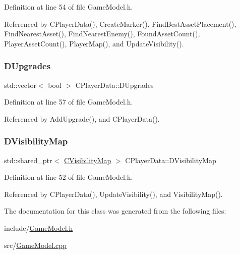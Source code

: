 Definition at line 54 of file Game\+Model.\+h.



Referenced by C\+Player\+Data(), Create\+Marker(), Find\+Best\+Asset\+Placement(), Find\+Nearest\+Asset(), Find\+Nearest\+Enemy(), Found\+Asset\+Count(), Player\+Asset\+Count(), Player\+Map(), and Update\+Visibility().

\hypertarget{classCPlayerData_ae7cb90c31ec46b65ba88485368a4b96a}{}\label{classCPlayerData_ae7cb90c31ec46b65ba88485368a4b96a} 
\subsubsection{\texorpdfstring{D\+Upgrades}{DUpgrades}}
{\footnotesize\ttfamily std\+::vector$<$ bool $>$ C\+Player\+Data\+::\+D\+Upgrades\hspace{0.3cm}{\ttfamily [protected]}}



Definition at line 57 of file Game\+Model.\+h.



Referenced by Add\+Upgrade(), and C\+Player\+Data().

\hypertarget{classCPlayerData_a804ea65e7ec7c90b2e335414d106cc78}{}\label{classCPlayerData_a804ea65e7ec7c90b2e335414d106cc78} 
\subsubsection{\texorpdfstring{D\+Visibility\+Map}{DVisibilityMap}}
{\footnotesize\ttfamily std\+::shared\+\_\+ptr$<$ \hyperlink{classCVisibilityMap}{C\+Visibility\+Map} $>$ C\+Player\+Data\+::\+D\+Visibility\+Map\hspace{0.3cm}{\ttfamily [protected]}}



Definition at line 52 of file Game\+Model.\+h.



Referenced by C\+Player\+Data(), Update\+Visibility(), and Visibility\+Map().



The documentation for this class was generated from the following files\+:\begin{DoxyCompactItemize}
\item 
include/\hyperlink{GameModel_8h}{Game\+Model.\+h}\item 
src/\hyperlink{GameModel_8cpp}{Game\+Model.\+cpp}\end{DoxyCompactItemize}
